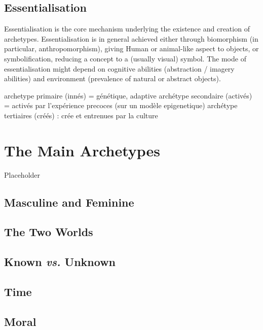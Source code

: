\documentclass[
]{book}
\begin{document}
\hypertarget{essentialisation}{%
\section{Essentialisation}\label{essentialisation}}

Essentialisation is the core mechanism underlying the existence and creation of archetypes. Essentialisation is in general achieved either through biomorphism (in particular, anthropomorphism), giving Human or animal-like aspect to objects, or symbolification, reducing a concept to a (usually visual) symbol. The mode of essentialisation might depend on cognitive abilities (abstraction / imagery abilities) and environment (prevalence of natural or abstract objects).

archetype primaire (innés) = génétique, adaptive
archétype secondaire (activés) = activés par l'expérience precoces (sur un modèle epigenetique)
archétype tertiaires (créés) : crée et entrenues par la culture

\hypertarget{the-main-archetypes}{%
\chapter{The Main Archetypes}\label{the-main-archetypes}}

Placeholder

\hypertarget{masculine-and-feminine}{%
\section{Masculine and Feminine}\label{masculine-and-feminine}}

\hypertarget{the-two-worlds}{%
\section{The Two Worlds}\label{the-two-worlds}}

\hypertarget{known-vs.-unknown}{%
\section{\texorpdfstring{Known \emph{vs.} Unknown}{Known vs. Unknown}}\label{known-vs.-unknown}}

\hypertarget{time}{%
\section{Time}\label{time}}

\hypertarget{moral}{%
\section{Moral}\label{moral}}
\end{document}
